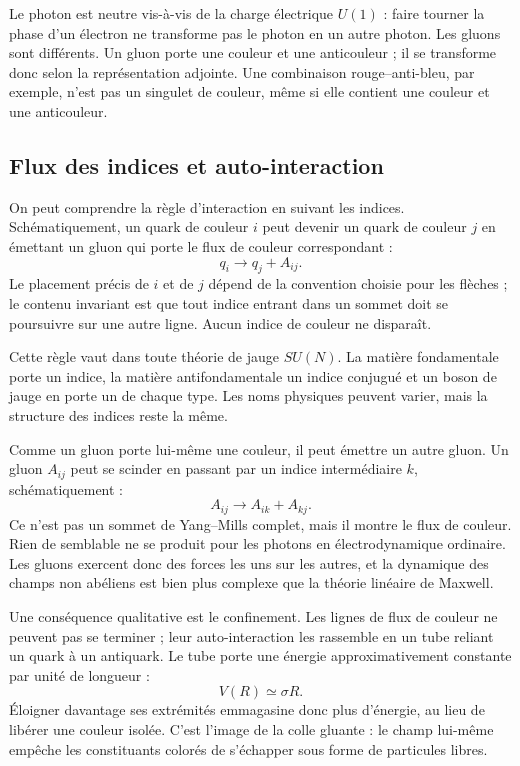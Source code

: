 Le photon est neutre vis-à-vis de la charge électrique \(U(1)\) : faire tourner la phase d’un électron ne transforme pas le photon en un autre photon. Les gluons sont différents. Un gluon porte une couleur et une anticouleur ; il se transforme donc selon la représentation adjointe. Une combinaison rouge--anti-bleu, par exemple, n’est pas un singulet de couleur, même si elle contient une couleur et une anticouleur.

\subsection{Flux des indices et auto-interaction}

On peut comprendre la règle d’interaction en suivant les indices. Schématiquement, un quark de couleur \(i\) peut devenir un quark de couleur \(j\) en émettant un gluon qui porte le flux de couleur correspondant :
\begin{equation}
q_i\longrightarrow q_j+A_{ij}.
\label{eq:l5-quark-gluon-vertex}
\end{equation}
Le placement précis de \(i\) et de \(j\) dépend de la convention choisie pour les flèches ; le contenu invariant est que tout indice entrant dans un sommet doit se poursuivre sur une autre ligne. Aucun indice de couleur ne disparaît.

Cette règle vaut dans toute théorie de jauge \(SU(N)\). La matière fondamentale porte un indice, la matière antifondamentale un indice conjugué et un boson de jauge en porte un de chaque type. Les noms physiques peuvent varier, mais la structure des indices reste la même.

Comme un gluon porte lui-même une couleur, il peut émettre un autre gluon. Un gluon \(A_{ij}\) peut se scinder en passant par un indice intermédiaire \(k\), schématiquement :
\begin{equation}
A_{ij}\longrightarrow A_{ik}+A_{kj}.
\label{eq:l5-three-gluon-index}
\end{equation}
Ce n’est pas un sommet de Yang--Mills complet, mais il montre le flux de couleur. Rien de semblable ne se produit pour les photons en électrodynamique ordinaire. Les gluons exercent donc des forces les uns sur les autres, et la dynamique des champs non abéliens est bien plus complexe que la théorie linéaire de Maxwell.

Une conséquence qualitative est le confinement. Les lignes de flux de couleur ne peuvent pas se terminer ; leur auto-interaction les rassemble en un tube reliant un quark à un antiquark. Le tube porte une énergie approximativement constante par unité de longueur :
\begin{equation}
V(R)\simeq \sigma R.
\end{equation}
Éloigner davantage ses extrémités emmagasine donc plus d’énergie, au lieu de libérer une couleur isolée. C’est l’image de la colle gluante : le champ lui-même empêche les constituants colorés de s’échapper sous forme de particules libres.

